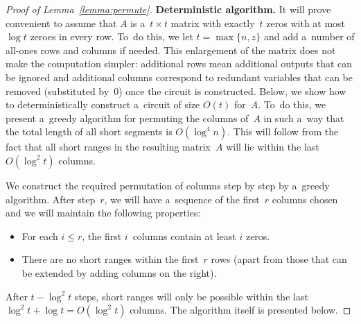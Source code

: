 \begin{proof}[Proof of Lemma~\ref{lemma:permute}]
\textbf{Deterministic algorithm.}
It will prove convenient to assume that $A$ is a~$t \times t$ matrix with
exactly~$t$ zeros with at most $\log t$ zeroes in every row. To~do this, we let
$t=\max\{n, z\}$ and add a~number of all-ones rows and columns if needed. This
enlargement of the matrix does not make the computation simpler: additional rows
mean additional outputs that can be ignored and additional columns correspond to
redundant variables that can be removed (substituted by~0) once the circuit is
constructed. Below, we show how to deterministically construct a~circuit of size
$O(t)$ for~$A$. To~do this, we present a~greedy algorithm for permuting the
columns of~$A$ in such a~way that the total length of all short segments
is $O(\log^4n)$. This will follow from the fact that all short ranges in the
resulting matrix~$A$ will lie within the last $O(\log^2 t)$ columns.

We construct the required permutation of columns step by step by a~greedy
algorithm. After step~$r$, we will have a~sequence of the first~$r$ columns
chosen and we will maintain the following properties:
\begin{itemize}
\item For each $i \leq r$, the first $i$~columns contain at least $i$ zeros.
\item There are no short ranges within the first~$r$ rows (apart from those
that can be extended by adding columns on the right).
\end{itemize}

After $t - \log^2 t$ steps, short ranges will only be possible within the last
$\log^2 t + \log t = O(\log^2 t)$ columns. The algorithm itself is presented
below.


\end{proof}
